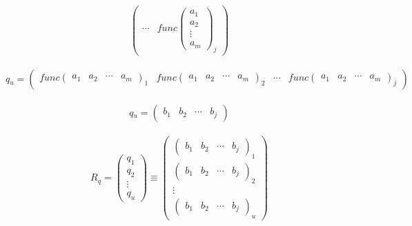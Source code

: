 \begin{center}
\[\begin{pmatrix}
            \cdots &
            \textit{func}\begin{pmatrix} a_{1}  \\  a_{2}  \\  \vdots   \\ a_{m} \end{pmatrix}_{j}
        \end{pmatrix}   
    \]
    \\
    \[  \textit{q$_{u}$} = 
        \begin{pmatrix}
            \textit{func}\begin{pmatrix} a_{1}  &  a_{2}  &  \cdots   & a_{m} \end{pmatrix}_{1} & 
            \textit{func}\begin{pmatrix} a_{1}  &  a_{2}  &  \cdots   & a_{m} \end{pmatrix}_{2} & 
            \cdots & 
            \textit{func}\begin{pmatrix} a_{1}  &  a_{2}  &  \cdots   & a_{m} \end{pmatrix}_{j}
        \end{pmatrix}
    \]
    \\
    \[  \textit{q$_{u}$} = 
        \begin{pmatrix}
            b_{1}  &  b_{2}  &  \cdots   & b_{j} 
        \end{pmatrix}
    \]
    \\
    \[ 
        \textit{R$_{q}$} = 
        \begin{pmatrix}
            q_{1}  \\  q_{2}  \\  \vdots \\ q_{u}
        \end{pmatrix}
        \equiv
        \begin{pmatrix}
            \begin{pmatrix}
                b_{1}  &  b_{2}  &  \cdots   & b_{j} 
            \end{pmatrix}_{1}\\
            \begin{pmatrix}
                b_{1}  &  b_{2}  &  \cdots   & b_{j} 
            \end{pmatrix}_{2}\\
            \vdots\\
            \begin{pmatrix}
                b_{1}  &  b_{2}  &  \cdots   & b_{j} 
            \end{pmatrix}_{u}
        \end{pmatrix}
    \]
\end{center}    

